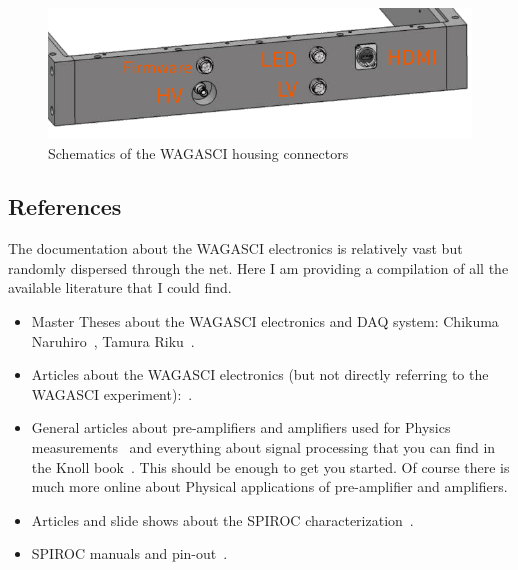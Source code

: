 \begin{figure}[H]
    \centering
    \includegraphics[width=0.7\linewidth,frame]{WAGASCI-housing-schematics}
    \caption{Schematics of the WAGASCI housing
      connectors}\label{fig:WAGASCI-housing-schematics}
  \end{figure}
  
{}

{}

{}


\subsection{References}
The documentation about the WAGASCI electronics is relatively vast but randomly
dispersed through the net. Here I am providing a compilation of all the
available literature that I could find.

\begin{itemize}
\item Master Theses about the WAGASCI electronics and DAQ system: Chikuma
  Naruhiro~\cite{Chikuma:2016}, Tamura Riku~\cite{Tamura:2018}.
\item Articles about the WAGASCI electronics (but not directly referring to the
  WAGASCI experiment):~\cite{Gastaldi:2014vaa,Gastaldi:2014oid,GDCC:2012}.
\item General articles about pre-amplifiers and amplifiers used for Physics
  measurements~\cite{Hamamatsu:2001,Bertuccio:1996,Lioliou:2015,Ortec} and
  everything about signal processing that you can find in the Knoll
  book~\cite{Knoll:2010radiation}. This should be enough to get you started. Of
  course there is much more online about Physical applications of pre-amplifier
  and amplifiers.  
\item Articles and slide shows about the SPIROC
  characterization~\cite{Callier:2008,Callier:2009,Fabbri:2009,%
    Callier:2013,Callier:2015}.
\item SPIROC manuals and
  pin-out~\cite{SPIROC2Dpinlist,SPIROC2Ddatasheet,SPIROC:OMEGA}.
\end{itemize}

